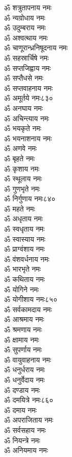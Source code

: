 \begin{center}
\begin{multicols}{2}
\begin{flushleft}
ॐ शत्रुतापनाय नमः\\
ॐ न्यग्रोधाय नमः\\
ॐ उदुम्बराय नमः\\
ॐ अश्वत्थाय नमः\\
ॐ चाणूरान्ध्रनिषूदनाय नमः\\
ॐ सहस्रार्चिषे नमः\\
ॐ सप्तजिह्वाय नमः\\
ॐ सप्तैधसे नमः\\
ॐ सप्तवाहनाय नमः\\
ॐ अमूर्तये नमः\hfill ८३०\\
ॐ अनघाय नमः\\
ॐ अचिन्त्याय नमः\\
ॐ भयकृते नमः\\
ॐ भयनाशनाय नमः\\
ॐ अणवे नमः\\
ॐ बृहते नमः\\
ॐ कृशाय नमः\\
ॐ स्थूलाय नमः\\
ॐ गुणभृते नमः\\
ॐ निर्गुणाय नमः\hfill ८४०\\
ॐ महते नमः\\
ॐ अधृताय नमः\\
ॐ स्वधृताय नमः\\
ॐ स्वास्याय नमः\\
ॐ प्राग्वंशाय नमः\\
ॐ वंशवर्धनाय नमः\\
ॐ भारभृते नमः\\
ॐ कथिताय नमः\\
ॐ योगिने नमः\\
ॐ योगीशाय नमः\hfill ८५०\\
ॐ सर्वकामदाय नमः\\
ॐ आश्रमाय नमः\\
ॐ श्रमणाय नमः\\
ॐ क्षामाय नमः\\
ॐ सुपर्णाय नमः\\
ॐ वायुवाहनाय नमः\\
ॐ धनुर्धराय नमः\\
ॐ धनुर्वेदाय नमः\\
ॐ दण्डाय नमः\\
ॐ दमयित्रे नमः\hfill ८६०\\
ॐ दमाय नमः\\
ॐ अपराजिताय नमः\\
ॐ सर्वसहाय नमः\\
ॐ नियन्त्रे नमः\\
ॐ अनियमाय नमः\\

\end{flushleft}
\end{multicols}
\end{center}
